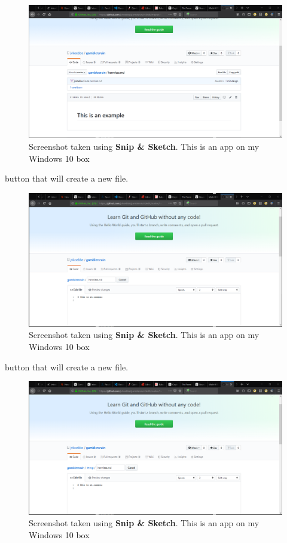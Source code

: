 \documentclass[10pt,fleqn]{article}
\begin{document}
\begin{figure}[h]
\centering
\includegraphics{../images/github_10.png}
\caption{{Screenshot} taken using {\bf Snip \& Sketch}. This is an app on
         my Windows 10 box}
\end{figure}
\eject
button that will create a new file.
\vfill
\begin{figure}[h]
\centering
\includegraphics{../images/github_11.png}
\caption{{Screenshot} taken using {\bf Snip \& Sketch}. This is an app on
         my Windows 10 box}
\end{figure}
\eject
button that will create a new file.
\vfill
\begin{figure}[h]
\centering
\includegraphics{../images/github_12.png}
\caption{{Screenshot} taken using {\bf Snip \& Sketch}. This is an app on
         my Windows 10 box}
\end{figure}
\end{document}
